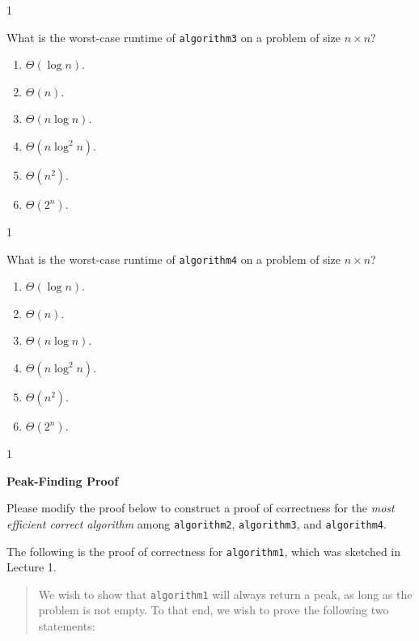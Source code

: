 \documentclass[12pt,twoside]{article}
\begin{document}
\begin{problems}
\begin{problemparts}
\ifsolution \solution{}
1
\fi

\problempart {} What is the worst-case runtime of \texttt{algorithm3} on a problem of size $n \times n$?
\begin{enumerate}
\item $\Theta(\log n)$.
\item $\Theta(n)$.
\item $\Theta(n \log n)$.
\item $\Theta(n \log^2 n)$.
\item $\Theta(n^2)$.
\item $\Theta(2^n)$.
\end{enumerate}

\ifsolution \solution{}
1
\fi

\problempart {} What is the worst-case runtime of \texttt{algorithm4} on a problem of size $n \times n$?
\begin{enumerate}
\item $\Theta(\log n)$.
\item $\Theta(n)$.
\item $\Theta(n \log n)$.
\item $\Theta(n \log^2 n)$.
\item $\Theta(n^2)$.
\item $\Theta(2^n)$.
\end{enumerate}

\ifsolution \solution{}
1
\fi

\end{problemparts}

\problem {} \textbf{Peak-Finding Proof}

Please modify the proof below to construct a proof of correctness
for the \emph{most efficient correct algorithm}
among \texttt{algorithm2}, \texttt{algorithm3}, and \texttt{algorithm4}.

The following is the proof of correctness
for \texttt{algorithm1},
which was sketched in Lecture 1.

\begin{quote}
We wish to show that \texttt{algorithm1}
will always return a peak,
as long as the problem is not empty.
To that end,
we wish to prove the following two statements:


\end{quote}
\end{problems}
\end{document}
